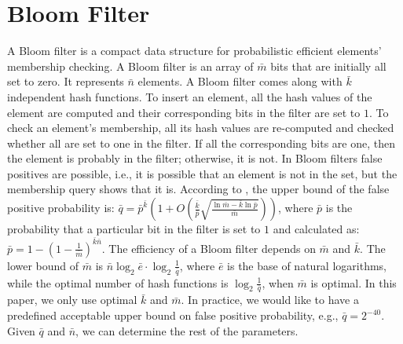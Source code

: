 


\section{Bloom Filter}\label{sec::bloom-filter-}

A Bloom filter \cite{DBLP:journals/cacm/Bloom70} is a compact data structure for probabilistic efficient  elements'  membership checking. A Bloom filter is an array of $\bar  m$ bits that are initially all set to zero. It  represents $\bar n$  elements.  A Bloom filter comes along with  $\bar k$ independent hash functions. To insert an element, all the hash values of the element are computed and their corresponding bits in the filter are set to $1$. To check an element's membership, all its hash values are re-computed and checked whether all are set to one in the filter. If all the corresponding bits are one, then the element is probably in the filter; otherwise, it is not. In Bloom filters false positives are possible, i.e., it is possible that an element is not in the set, but the membership query shows that it is. According to \cite{BoseGKMMMST08}, the upper bound of the false positive probability is: $\bar q=\bar p^{\scriptscriptstyle \bar  k}(1+O(\frac{\bar k}{\bar p}\sqrt{\frac{\ln \bar m - \bar k \ln \bar  p}{\bar m}}))$,  where $\bar p$ is the probability that a particular bit in the filter is set to $1$ and calculated as: $\bar p=1-(1-\frac{1}{\bar m})^{\scriptscriptstyle \bar k\bar n}$. The efficiency of a Bloom filter depends
on  $\bar m$ and $\bar k$. The lower bound of $\bar m$  is $\bar  n \log_{\scriptscriptstyle 2}
\bar e \cdot\log_{\scriptscriptstyle 2} \frac{1}{\bar q}$, where $\bar e$ is the base of natural logarithms,  while the optimal number of hash functions is    $\log_{\scriptscriptstyle 2} \frac{1}{\bar q}$, when $\bar m$ is optimal. In this paper, we only use optimal $\bar k$ and $\bar m$. In practice, we would like to have a predefined acceptable upper bound on false positive probability, e.g., $\bar q=2^{\scriptscriptstyle - 40}$. Given $\bar q$ and $\bar n$, we can determine the rest of the parameters. 

